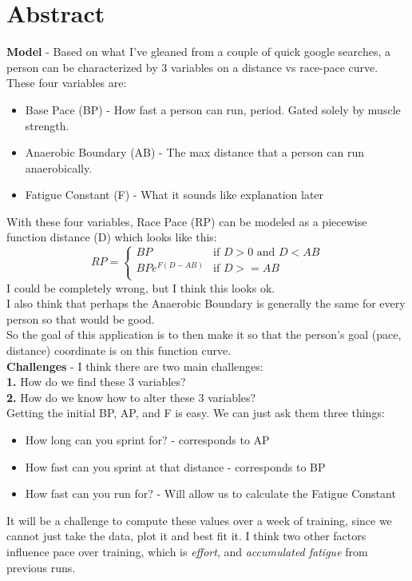 \documentclass{article}
\begin{document}
\section{Abstract}
\textbf{Model} - Based on what I've gleaned from a couple of quick google searches, a person can be characterized by 3 variables on a distance vs race-pace curve. \\
These four variables are:
\begin{itemize}
    \item Base Pace (BP) - How fast a person can run, period. Gated solely by muscle strength.
    \item Anaerobic Boundary (AB) - The max distance that a person can run anaerobically. 
    \item Fatigue Constant (F) - What it sounds like explanation later
\end{itemize}
With these four variables, Race Pace (RP) can be modeled as a piecewise function distance (D) which looks like this:
\abovedisplayskip=0pt\relax
\[
RP  =
\begin{cases}
BP & \text{if } D>0  \text{ and }  D < AB\\
BPe^{F(D - AB)} & \text{if } D>=AB\\
\end{cases}
\]
I could be completely wrong, but I think this looks ok.\\
I also think that perhaps the Anaerobic Boundary is generally the same for every person so that would be good. \\
So the goal of this application is to then make it so that the person's goal (pace, distance) coordinate is on this function curve.\\
\textbf{Challenges} - I think there are two main challenges:\\
\indent \textbf{1. }How do we find these 3 variables?\\
\indent \textbf{2. }How do we know how to alter these 3 variables?\\
Getting the initial BP, AP, and F is easy. We can just ask them three things:
\begin{itemize}
\item How long can you sprint for? - corresponds to AP
\item How fast can you sprint at that distance - corresponds to BP
\item How fast can you run for? - Will allow us to calculate the Fatigue Constant
\end{itemize}
It will be a challenge to compute these values over a week of training, since we cannot just take the data, plot it and best fit it. I think two other factors influence pace over training, which is \textit{effort}, and \textit{accumulated fatigue} from previous runs. 
\end{document}

